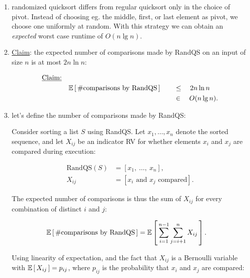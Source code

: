 \begin{enumerate}
  \item randomized quicksort differs from regular quicksort only in the choice
    of pivot. Instead of choosing eg. the middle, first, or last element as
    pivot, we choose one uniformly at random. With this strategy we can obtain
    an \emph{expected} worst case runtime of $O(n \lg n)$.

  \item \underline{Claim}: the expected number of comparisons made by RandQS on an input of
    size $n$ is at most $2 n \ln n$:

    \begin{textred}
      \begin{alignat}{3}
        \text{\underline{Claim:}}\quad&&&\\
                                &\mathbb E\left[\, \text{\#comparisons by RandQS}\, \right] \quad &&\leq\quad 2n \ln n\\
                                &                                         &&\in\quad O(n \lg n).
      \end{alignat}
    \end{textred}

  \item let's define the number of comparisons made by RandQS:
    
    Consider sorting a list $S$ using RandQS. Let $x_1, \dots, x_n$ denote the
    sorted sequence, and let $X_{ij}$ be an indicator RV for whether elements
    $x_i$ and $x_j$ are compared during execution:

    \begin{textred}
      \begin{align}
        \text{RandQS}(S) &= [x_1,\ \dots,\ x_n],\\[4pt]
        X_{ij} &= [x_i \text{ and } x_j \text{ compared}].
      \end{align}
    \end{textred}

    The expected number of comparisons is thus the sum of $X_{ij}$ for every
    combination of distinct $i$ and $j$:

    \begin{textred}
      \begin{align}
        \mathbb E\left[\, \text{\#comparisons by RandQS}\, \right] &= \mathbb E\left[\, \sum_{i = 1}^{n - 1}\sum_{j =
        i + 1}^n X_{ij}\, \right].
      \end{align}
    \end{textred}


    Using linearity of expectation, and the fact that $X_{ij}$ is a Bernoulli
    variable with $\mathbb E\left[\, X_{ij}\, \right] = p_{ij}$, where $p_{ij}$ is the probability that
    $x_i$ and $x_j$ are compared:


\end{enumerate}
